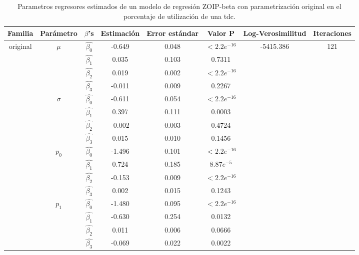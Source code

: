 \begin{table}[!hbt]
{\scriptsize
\begin{center}
\begin{tabular}{|c|c|c|ccc|c|c|}\hline
Familia & Par\'{a}metro & $\beta$'s & Estimaci\'{o}n & Error est\'{a}ndar & Valor P & Log-Verosimilitud & Iteraciones \\ \hline \hline
\multirow{12}{*}{original} & \multirow{4}{*}{$\mu$} & $\hat{\beta_0}$ & -0.649	&0.048	&$<2.2e^{-16}$  & \multirow{12}{*}{-5415.386} & \multirow{12}{*}{121} \\
& & $\hat{\beta_1}$ & 0.035	&0.103	&0.7311   & &\\
& & $\hat{\beta_2}$ & 0.019	&0.002	&$<2.2e^{-16}$   & &\\
& & $\hat{\beta_3}$ & -0.011	&0.009	&0.2267 & & \\ \cline{2-6}
& \multirow{4}{*}{$\sigma$} & $\hat{\beta_0}$ & -0.611	&0.054	&$<2.2e^{-16}$   & &\\
& & $\hat{\beta_1}$ & 0.397	&0.111	&0.0003   & &\\
& & $\hat{\beta_2}$ & -0.002	&0.003	&0.4724   & &\\
& & $\hat{\beta_3}$ & 0.015	&0.010	&0.1456   & &\\ \cline{2-6}
& \multirow{4}{*}{$p_0$} & $\hat{\beta_0}$ & -1.496	&0.101	&$<2.2e^{-16}$  & &\\
& & $\hat{\beta_1}$ & 0.724	&0.185	&$8.87e^{-5}$  & &\\
& & $\hat{\beta_2}$ & -0.153	&0.009	&$<2.2e^{-16}$  & &\\
& & $\hat{\beta_3}$ & 0.002	&0.015	&0.1243  & &\\ \cline{2-6}
& \multirow{4}{*}{$p_1$} & $\hat{\beta_0}$ &-1.480	&0.095	&$<2.2e^{-16}$  & &\\
& & $\hat{\beta_1}$ & -0.630	&0.254	&0.0132  & &\\
& & $\hat{\beta_2}$ & 0.011	&0.006	&0.0666  & &\\
& & $\hat{\beta_3}$ & -0.069	&0.022	&0.0022  & &\\ \hline


\end{tabular}
\caption{Parametros regresores estimados de un modelo de regresi\'{o}n ZOIP-beta con parametrizaci\'{o}n original en el porcentaje de utilizaci\'{o}n de una tdc.}
\label{T_Apli_CC_Ori}
\end{center}
}
\end{table}


